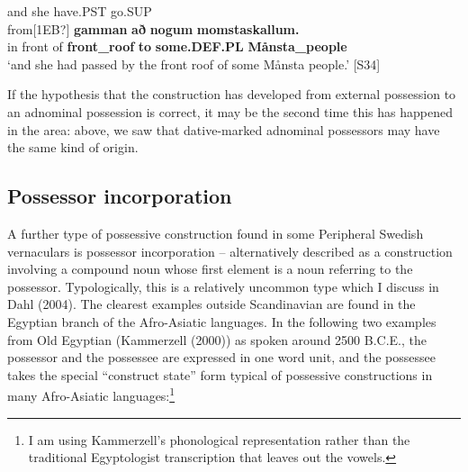 and  she  have.PST  go.SUP\\ %


\ea\label{}
\gll from[1EB?]  \textbf{gamman} \textbf{að} \textbf{nogum} \textbf{momstaskallum.}\\


in front of   \textbf{front\_roof} \textbf{to} \textbf{some.DEF.PL} \textbf{Månsta\_people}\\ %


‘and she had passed by the front roof of some Månsta people.’ [S34]
\z

If the hypothesis that the  construction has developed from external possession to an adnominal possession is correct, it may be the second time this has happened in the area: above, we saw that dative-marked adnominal possessors may have the same kind of origin. 

\subsection[Possessor incorporation]{Possessor incorporation}
A further type of possessive construction found in some Peripheral Swedish vernaculars is possessor incorporation – alternatively described as a construction involving a compound noun whose first element is a noun referring to the possessor. Typologically, this is a relatively uncommon type which I discuss in Dahl (2004). The clearest examples outside Scandinavian are found in the Egyptian branch of the Afro-Asiatic languages. In the following two examples from Old Egyptian (Kammerzell (2000)) as spoken around 2500 B.C.E., the possessor and the possessee are expressed in one word unit, and the possessee takes the special “construct state” form typical of possessive constructions in many Afro-Asiatic languages:\footnote{ I am using Kammerzell’s phonological representation rather than the traditional Egyptologist transcription that leaves out the vowels.}

